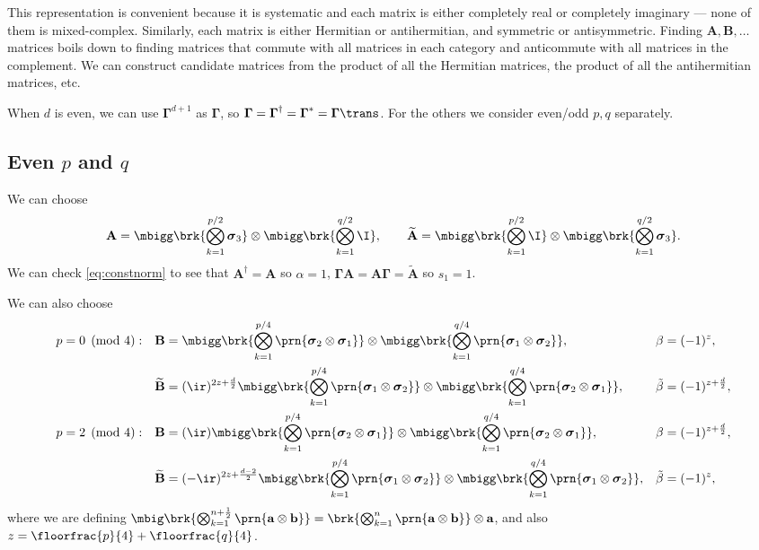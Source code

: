 \documentclass[11pt]{article}
\newcommand{\cc}{^\ast}
\newcommand{\hc}{^\dag}
\newcommand{\Gammab}{\boldsymbol{\Gamma}}
\newcommand{\A}{\mathbf{A}}
\newcommand{\B}{\mathbf{B}}
\newcommand{\At}{\widetilde{\A}}
\newcommand{\Bt}{\widetilde{\B}}
\newcommand{\sigmab}{\boldsymbol{\sigma}}
\newcommand{\betat}{\tilde{\beta}}
\begin{document}
This representation is convenient because it is systematic and each matrix is either completely real or completely imaginary --- none of them is mixed-complex.
Similarly, each matrix is either Hermitian or antihermitian, and symmetric or antisymmetric.
Finding \(\A, \B, \dots\) matrices boils down to finding matrices that commute with all matrices in each category and anticommute with all matrices in the complement.
We can construct candidate matrices from the product of all the Hermitian matrices, the product of all the antihermitian matrices, etc.

When \(d\) is even, we can use \(\Gammab^{d+1}\) as \(\Gammab\), so \(\Gammab = \Gammab\hc = \Gammab\cc =\Gammab\trans\).
For the others we consider even/odd \(p,q\) separately.


\subsection{Even \texorpdfstring{\(p\) and \(q\)}{p and q}}\label{sec:eveneven}

We can choose
%
\begin{equation*}
  \A = \mbigg\brk{\bigotimes_{k=1}^{p/2} \sigmab_3}
        \otimes \mbigg\brk{\bigotimes_{k=1}^{q/2} \I},
  \qquad
  \At = \mbigg\brk{\bigotimes_{k=1}^{p/2} \I}
        \otimes \mbigg\brk{\bigotimes_{k=1}^{q/2} \sigmab_3}.
\end{equation*}
%
We can check \cref{eq:constnorm} to see that \(\A\hc = \A\) so \(\alpha=1\), \(\Gammab \A = \A \Gammab = \At\) so \(s_1 = 1\).

We can also choose
%
\begin{equation*}
\begin{aligned}
  p &= 0 \pmod 4: &
  \B &= \mbigg\brk{\bigotimes_{k=1}^{p/4} \prn{\sigmab_2 \otimes \sigmab_1}} \otimes
        \mbigg\brk{\bigotimes_{k=1}^{q/4} \prn{\sigmab_1 \otimes \sigmab_2}}, &
  \beta &= (-1)^{z}, \\ &&
  \Bt &= (\ir)^{2z + \frac{d}{2}}
        \mbigg\brk{\bigotimes_{k=1}^{p/4} \prn{\sigmab_1 \otimes \sigmab_2}} \otimes
        \mbigg\brk{\bigotimes_{k=1}^{q/4} \prn{\sigmab_2 \otimes \sigmab_1}}, &
  \betat &= (-1)^{z+\frac{d}{2}}, \\
  p &= 2 \pmod 4: &
  \B &= (\ir)
        \mbigg\brk{\bigotimes_{k=1}^{p/4} \prn{\sigmab_2 \otimes \sigmab_1}} \otimes
        \mbigg\brk{\bigotimes_{k=1}^{q/4} \prn{\sigmab_2 \otimes \sigmab_1}}, &
  \beta &= (-1)^{z + \frac{d}{2}}, \\ &&
  \Bt &= (-\ir)^{2z + \frac{d-2}{2}}
        \mbigg\brk{\bigotimes_{k=1}^{p/4} \prn{\sigmab_1 \otimes \sigmab_2}} \otimes
        \mbigg\brk{\bigotimes_{k=1}^{q/4} \prn{\sigmab_1 \otimes \sigmab_2}}, &
  \betat &= (-1)^{z}, 
      \end{aligned}
\end{equation*}
%
where we are defining \( \mbig\brk{\bigotimes_{k=1}^{n+\frac{1}{2}} \prn{\mathbf{a} \otimes \mathbf{b}}}
= \brk{\bigotimes_{k=1}^{n} \prn{\mathbf{a} \otimes \mathbf{b}}} \otimes \mathbf{a} \),
and also \(z = \floorfrac{p}{4} + \floorfrac{q}{4}\).
\end{document}

